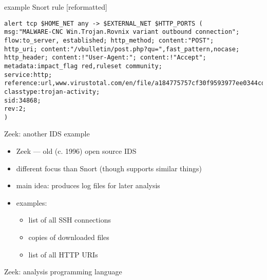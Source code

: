 \begin{frame}[fragile]{example Snort rule [reformatted]}
\begin{Verbatim}[fontsize=\small]
alert tcp $HOME_NET any -> $EXTERNAL_NET $HTTP_PORTS (
msg:"MALWARE-CNC Win.Trojan.Rovnix variant outbound connection";
flow:to_server, established; http_method; content:"POST";
http_uri; content:"/vbulletin/post.php?qu=",fast_pattern,nocase;
http_header; content:!"User-Agent:"; content:!"Accept";
metadata:impact_flag red,ruleset community;
service:http;
reference:url,www.virustotal.com/en/file/a184775757cf30f9593977ee0344cd6c54deb4b14a012a7af8e3a2cdbb85a749/analysis/;
classtype:trojan-activity;
sid:34868;
rev:2;
)
\end{Verbatim}
\end{frame}

\begin{frame}[fragile]{Zeek: another IDS example}
    \begin{itemize}
    \item Zeek --- old (c. 1996) open source IDS
    \item different focus than Snort (though supports similar things)
    \vspace{.5cm}
    \item main idea: produces log files for later analysis
    \item examples:
        \begin{itemize}
        \item list of all SSH connections
        \item copies of downloaded files
        \item list of all HTTP URIs
        \end{itemize}
    \end{itemize}
\end{frame}

\begin{frame}{Zeek: analysis programming language}
\end{frame}
